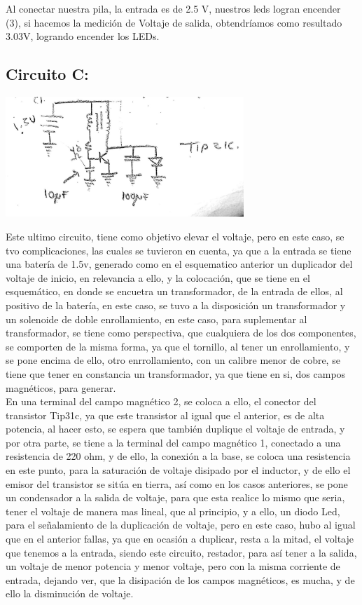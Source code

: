 \documentclass[12pt,letterpaper]{article}
\begin{document}
Al conectar nuestra pila, la entrada es de 2.5 V, nuestros leds logran encender (3), si hacemos la medición de Voltaje de salida, obtendríamos como resultado 3.03V, logrando encender los LEDs.
\subsection{Circuito C:}
\begin{center}
\includegraphics[width=9cm]{esquema3.jpeg}
\end{center}

Este ultimo circuito, tiene como objetivo elevar el voltaje, pero en este caso, se tvo complicaciones, las cuales se tuvieron en cuenta, ya que a la entrada se tiene una batería de 1.5v, generado como en el esquematico anterior un duplicador del voltaje de inicio, en relevancia a ello, y la colocación, que se tiene en el esquemático, en donde se encuetra un transformador, de la entrada de ellos, al positivo de la batería, en este caso, se tuvo a la disposición un transformador y un solenoide de doble enrollamiento, en este caso, para suplementar al transformador, se tiene como perspectiva, que cualquiera de los dos componentes, se comporten de la misma forma, ya que el tornillo, al tener un enrollamiento, y se pone encima de ello, otro enrrollamiento, con un calibre menor de cobre, se tiene que tener en constancia un transformador, ya que tiene en si, dos campos magnéticos, para generar.\\

En una terminal del campo magnético 2, se coloca a ello, el conector del transistor Tip31c, ya que este transistor al igual que el anterior, es de alta potencia, al hacer esto, se espera que también duplique el voltaje de entrada, y por otra parte, se tiene a la terminal del campo magnético 1, conectado a una resistencia de 220 ohm, y de ello, la conexión a la base, se coloca una resistencia en este punto, para la saturación de voltaje disipado por el inductor, y de ello el emisor del transistor se sitúa en tierra, así como en los casos anteriores, se pone un condensador a la salida de voltaje, para que esta realice lo mismo que seria, tener el voltaje de manera mas lineal, que al principio, y a ello, un diodo Led, para el señalamiento de la duplicación de voltaje, pero en este caso, hubo al igual que en el anterior fallas, ya que en ocasión a duplicar, resta a la mitad, el voltaje que tenemos a la entrada, siendo este circuito, restador, para así tener a la salida, un voltaje de menor potencia y menor voltaje, pero con la misma corriente de entrada, dejando ver, que la disipación de los campos magnéticos, es mucha, y de ello la disminución de voltaje.\\
\end{document}
